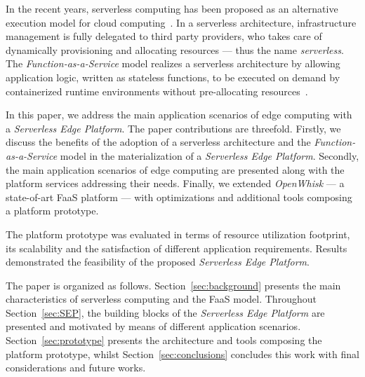 In the recent years, serverless computing has been proposed as an alternative execution model for cloud computing~\cite{Lloyd18serverless}. In a serverless architecture, infrastructure management is fully delegated to third party providers, who takes care of dynamically provisioning and allocating resources --- thus the name \textit{serverless}. The \textit{Function-as-a-Service} model realizes a serverless architecture by allowing application logic, written as stateless functions, to be executed on demand by containerized runtime environments without pre-allocating resources~\cite{Roberts:2018}. 

In this paper, we address the main application scenarios of edge computing with a \textit{Serverless Edge Platform}. The paper contributions are threefold. Firstly, we discuss the benefits of the adoption of a serverless architecture and the \textit{Function-as-a-Service} model in the materialization of a \textit{Serverless Edge Platform}. Secondly, the main application scenarios of edge computing are presented along with 
the platform services addressing their needs. Finally, we extended \textit{OpenWhisk} --- a state-of-art FaaS platform --- with optimizations and additional tools composing a platform prototype. 

The platform prototype was evaluated in terms of resource utilization footprint, its scalability and the satisfaction of different application requirements. Results demonstrated the feasibility of the proposed \textit{Serverless Edge Platform}.


The paper is organized as follows. Section~\ref{sec:background} presents the main characteristics of serverless computing and the FaaS model.
Throughout Section~\ref{sec:SEP}, the building blocks of the \textit{Serverless Edge Platform} are presented and motivated by means of different application scenarios. Section~\ref{sec:prototype} presents the architecture and tools composing the platform prototype, whilst %
Section~\ref{sec:conclusions} concludes this work with final considerations and future works.



